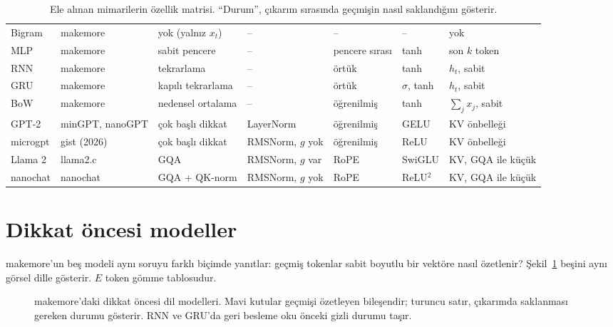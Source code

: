 \begin{table}[h]
  \centering\footnotesize
  \caption{Ele alınan mimarilerin özellik matrisi. ``Durum'', çıkarım sırasında geçmişin nasıl saklandığını gösterir.}
  \label{tab:aile}
  \setlength{\tabcolsep}{3.5pt}
  \begin{tabularx}{\textwidth}{@{}l l L l l l L@{}}
    \toprule
     &  &  &  &  &  &  \\ \midrule
    Bigram & makemore & yok (yalnız $x_t$) & -- & -- & -- & yok \\
    MLP & makemore & sabit pencere & -- & pencere sırası & tanh & son $k$ token \\
    RNN & makemore & tekrarlama & -- & örtük & tanh & $h_t$, sabit \\
    GRU & makemore & kapılı tekrarlama & -- & örtük & $\sigma$, tanh & $h_t$, sabit \\
    BoW & makemore & nedensel ortalama & -- & öğrenilmiş & tanh & $\sum_j x_j$, sabit \\
    GPT-2 & minGPT, nanoGPT & çok başlı dikkat & LayerNorm & öğrenilmiş & GELU & KV önbelleği \\
    microgpt & gist (2026) & çok başlı dikkat & RMSNorm, $g$ yok & öğrenilmiş & ReLU & KV önbelleği \\
    Llama 2 & llama2.c & GQA & RMSNorm, $g$ var & RoPE & SwiGLU & KV, GQA ile küçük \\
    nanochat & nanochat & GQA + QK-norm & RMSNorm, $g$ yok & RoPE & ReLU$^2$ & KV, GQA ile küçük \\ \bottomrule
  \end{tabularx}
\end{table}

\section{Dikkat öncesi modeller}\label{sec:onceki}

makemore'un beş modeli aynı soruyu farklı biçimde yanıtlar: geçmiş tokenlar sabit boyutlu bir vektöre nasıl özetlenir? Şekil~\ref{fig:onceki} beşini aynı görsel dille gösterir. $E$ token gömme tablosudur.

\begin{figure}[h]
  \centering
  \caption[Dikkat öncesi dil modelleri]{makemore'daki dikkat öncesi dil modelleri. Mavi kutular geçmişi özetleyen bileşendir; turuncu satır, çıkarımda saklanması gereken durumu gösterir. RNN ve GRU'da geri besleme oku önceki gizli durumu taşır.}
  \label{fig:onceki}
\end{figure}

